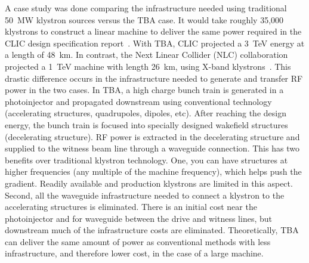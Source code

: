 A case study was done comparing the infrastructure 
needed using traditional \SI{50}{MW} klystron sources versus the TBA case.
It would take roughly 35,000 klystrons to construct a linear machine to deliver the same 
power required in the CLIC design specification report~\cite{CLICdesignReport}. 
With TBA, CLIC projected a \SI{3}{TeV} energy at a length of \SI{48}{km}.
In contrast, the Next Linear Collider (NLC) collaboration projected a \SI{1}{TeV} machine 
with length \SI{26}{km}, using X-band klystrons~\cite{NLC}. 
This drastic difference occurs in the infrastructure needed to generate and transfer
RF power in the two cases. In TBA, a high charge bunch train is generated in 
a photoinjector and propagated downstream using conventional technology 
(accelerating structures, quadrupoles, dipoles, etc). After reaching the design energy,
the bunch train is focused into specially designed wakefield structures (decelerating structure).
RF power is extracted in the decelerating structure and supplied to the witness 
beam line through a waveguide connection. This has two benefits over traditional klystron technology.
One, you can have structures at higher frequencies (any multiple of the machine frequency), 
which helps push the gradient. Readily available and production klystrons are limited in this aspect.
Second, all the waveguide infrastructure needed to connect a klystron to the accelerating 
structures is eliminated. There is an initial cost near the photoinjector 
and for waveguide between the drive and witness lines, 
but downstream much of the infrastructure costs are eliminated.
Theoretically, TBA can deliver the same amount of power as conventional methods with less 
infrastructure, and therefore lower cost, in the case of a large machine. 

